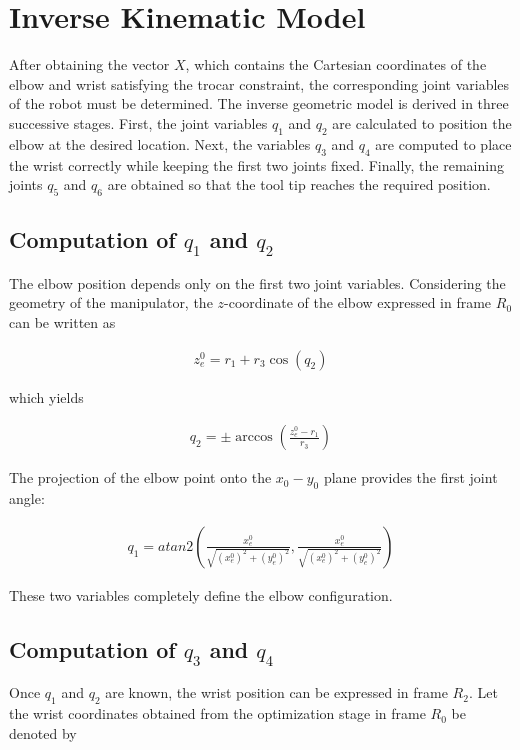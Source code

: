 \documentclass[12pt, a4paper]{article}
\begin{document}
\section{Inverse Kinematic Model}

After obtaining the vector \(X\), which contains the Cartesian coordinates of the elbow and wrist satisfying the trocar constraint, the corresponding joint variables of the robot must be determined. The inverse geometric model is derived in three successive stages. First, the joint variables \(q_1\) and \(q_2\) are calculated to position the elbow at the desired location. Next, the variables \(q_3\) and \(q_4\) are computed to place the wrist correctly while keeping the first two joints fixed. Finally, the remaining joints \(q_5\) and \(q_6\) are obtained so that the tool tip reaches the required position.

\subsection{Computation of \(q_1\) and \(q_2\)}

The elbow position depends only on the first two joint variables. Considering the geometry of the manipulator, the \(z\)-coordinate of the elbow expressed in frame \(R_0\) can be written as

\begin{align}
z_e^{0} = r_1 + r_3 \cos(q_2)
\end{align}

which yields

\begin{align}
q_2 = \pm \arccos\left(\frac{z_e^{0}-r_1}{r_3}\right)
\end{align}

The projection of the elbow point onto the \(x_0-y_0\) plane provides the first joint angle:

\begin{align}
q_1 = atan2\left(\frac{x_e^{0}}{\sqrt{(x_e^{0})^2 + (y_e^{0})^2}},\frac{x_e^{0}}{\sqrt{(x_e^{0})^2 + (y_e^{0})^2}}\right)
\end{align}

These two variables completely define the elbow configuration.

\subsection{Computation of \(q_3\) and \(q_4\)}

Once \(q_1\) and \(q_2\) are known, the wrist position can be expressed in frame \(R_2\). Let the wrist coordinates obtained from the optimization stage in frame \(R_0\) be denoted by
\end{document}

